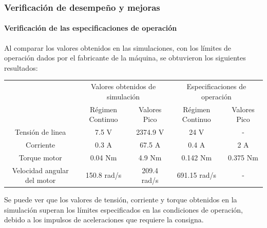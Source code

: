 \documentclass[a4paper, 10pt, onecolumn,journal]{ieeeconf}
\begin{document}
\subsubsection{\textbf{Verificación de desempeño y mejoras}}
\paragraph{\textbf{Verificación de las especificaciones de operación}}Al comparar los valores obtenidos en las simulaciones, con los límites de operación dados por el fabricante de la máquina, se obtuvieron los siguientes resultados:

\begin{table}[H]
	\centering
	\begin{tabular}{|c|cc|cc|}
		\hline
		\multirow{2}{*}{} & \multicolumn{2}{c|}{Valores obtenidos de simulación} & \multicolumn{2}{c|}{Especificaciones de operación}   \\ \cline{2-5} 
		& \multicolumn{1}{c|}{Régimen Continuo} & Valores Pico & \multicolumn{1}{c|}{Régimen Continuo} & Valores Pico \\ \hline
		Tensión de linea         & \multicolumn{1}{c|}{7.5 V}                & 2374.9 V            & \multicolumn{1}{c|}{24 V}                & -            \\ \hline
		Corriente         & \multicolumn{1}{c|}{0.3 A}                & 67.5 A            & \multicolumn{1}{c|}{0.4 A}                & 2 A            \\ \hline
		Torque motor            & \multicolumn{1}{c|}{0.04 Nm}                & 4.9 Nm            & \multicolumn{1}{c|}{0.142 Nm}               & 0.375 Nm           \\ \hline
		Velocidad angular del motor         & \multicolumn{1}{c|}{150.8 rad/s}               & 209.4 rad/s           & \multicolumn{1}{c|}{691.15 rad/s }               & -           \\ \hline
	\end{tabular}
\end{table}

Se puede ver que los valores de tensión, corriente y torque obtenidos en la simulación superan los límites especificados en las condiciones de operación, debido a los impulsos de aceleraciones que requiere la consigna. 
\end{document}

